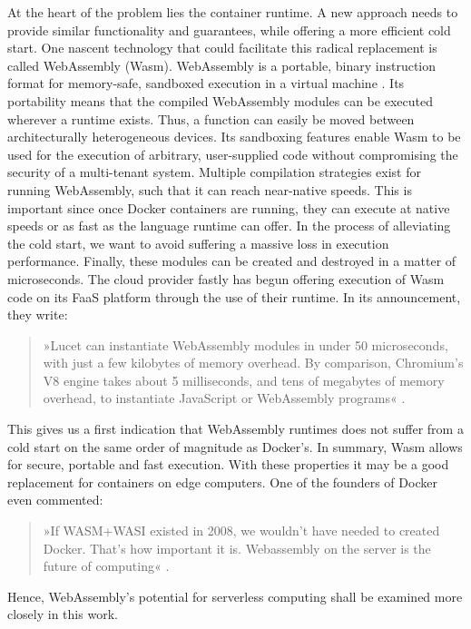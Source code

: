 At the heart of the problem lies the container runtime. A new approach needs to provide similar functionality and guarantees, while offering a more efficient cold start. One nascent technology that could facilitate this radical replacement is called WebAssembly (Wasm).
WebAssembly is a portable, binary instruction format for memory-safe, sandboxed execution in a virtual machine \cite{W3C2020}. Its portability means that the compiled WebAssembly modules can be executed wherever a runtime exists.
Thus, a function can easily be moved between architecturally heterogeneous devices. Its sandboxing features enable Wasm to be used for the execution of arbitrary, user-supplied code without compromising the security of a multi-tenant system. Multiple compilation strategies exist for running WebAssembly, such that it can reach near-native speeds. This is important since once Docker containers are running, they can execute at native speeds or as fast as the language runtime can offer. In the process of alleviating the cold start, we want to avoid suffering a massive loss in execution performance. Finally, these modules can be created and destroyed in a matter of microseconds. The cloud provider fastly has begun offering execution of Wasm code on its FaaS platform through the use of their  runtime. In its announcement, they write:

\begin{quote}
  »Lucet can instantiate WebAssembly modules in under 50 microseconds, with just a few kilobytes of memory overhead. By comparison, Chromium’s V8 engine takes about 5 milliseconds, and tens of megabytes of memory overhead, to instantiate JavaScript or WebAssembly programs« \cite{fastly2019}.
\end{quote}

This gives us a first indication that WebAssembly runtimes does not suffer from a cold start on the same order of magnitude as Docker's.
In summary, Wasm allows for secure, portable and fast execution. With these properties it may be a good replacement for containers on edge computers. One of the founders of Docker even commented:

\begin{quote}
  »If WASM+WASI existed in 2008, we wouldn't have needed to created Docker. That's how important it is. Webassembly on the server is the future of computing« \cite{Hykes2019}.
\end{quote}

Hence, WebAssembly's potential for serverless computing shall be examined more closely in this work.

